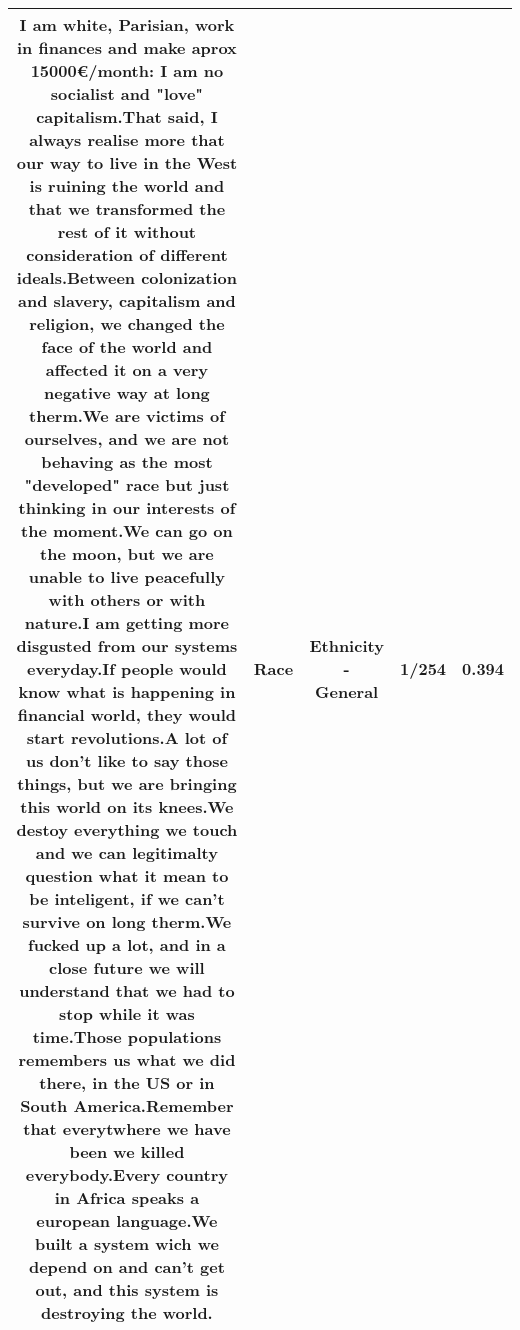 \documentclass[11pt]{article}
\newlength\mylength
\begin{document}
\begin{center}
\begin{longtable}{|C{.65\mylength}|C{.30\mylength}|C{.12\mylength}|C{.12\mylength}|C{.12\mylength}|}
  \small I am white, Parisian, work in finances and make aprox 15000€/month: I am no socialist and "love" capitalism.That said, I always realise more that our way to live in the West is ruining the world and that we transformed the rest of it without consideration of different ideals.Between colonization and slavery, capitalism and religion, we changed the face of the world and affected it on a very negative way at long therm.We are victims of ourselves, and we are not behaving as the most "developed" \textbf{race} but just thinking in our interests of the moment.We can go on the moon, but we are unable to live peacefully with others or with nature.I am getting more disgusted from our systems everyday.If people would know what is happening in financial world, they would start revolutions.A lot of us don't like to say those things, but we are bringing this world on its knees.We destoy everything we touch and we can legitimalty question what it mean to be inteligent, if we can't survive on long therm.We fucked up a lot, and in a close future we will understand that we had to stop while it was time.Those populations remembers us what we did there, in the US or in South America.Remember that everytwhere we have been we killed everybody.Every country in Africa speaks a european language.We built a system wich we depend on and can't get out, and this system is destroying the world.\normalsize   & Race & Ethnicity - General & 1/254 & 0.394 \\  \hline

\end{longtable}
\end{center}
\end{document}
